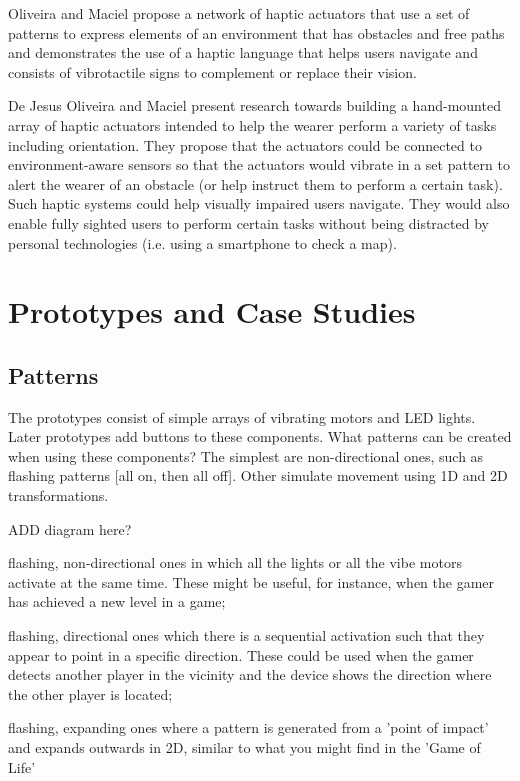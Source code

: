 \documentclass{chi-ext}
\begin{document}
Oliveira and Maciel propose a network of haptic actuators that use a set of patterns to express elements of an environment that has obstacles and free paths and demonstrates the use of a haptic language that helps users navigate and consists of vibrotactile signs to complement or replace their vision. \cite{Jesus-Oliveira:2013aa}

De Jesus Oliveira and Maciel \cite{Jesus-Oliveira:2013aa} present research towards building a hand-mounted array of haptic actuators intended to help the wearer perform a variety of tasks including orientation. They propose that the actuators could be connected to environment-aware sensors so that the actuators would vibrate in a set pattern to alert the wearer of an obstacle (or help instruct them to perform a certain task). Such haptic systems could help visually impaired users navigate. They would also enable fully sighted users to perform certain tasks without being distracted by personal technologies (i.e. using a smartphone to check a map).


\section{Prototypes and Case Studies}
\subsection{Patterns}
The prototypes consist of simple arrays of vibrating motors and LED lights. Later prototypes add buttons to these components. What patterns can be created when using these components? The simplest are non-directional ones, such as flashing patterns [all on, then all off]. Other simulate movement using 1D and 2D transformations.

ADD diagram here?

\begin{inparaenum}
\item flashing, non-directional ones in which all the lights or all the vibe motors activate at the same time. These might be useful, for instance, when the gamer has achieved a new level in a game;
\item flashing, directional ones which there is a sequential activation such that they appear to point in a specific direction. These could be used when the gamer detects another player in the vicinity and the device shows the direction where the other player is located;
\item flashing, expanding ones where a pattern is generated from a 'point of impact' and expands outwards in 2D, similar to what you might find in the 'Game of Life'
\end{inparaenum}
\end{document}
